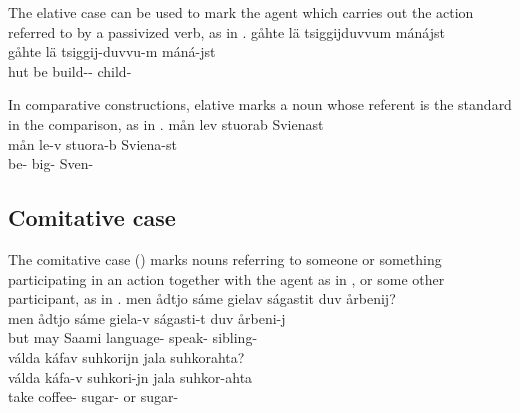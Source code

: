 The elative case can be used to mark the agent which carries out the action referred to by a passivized verb, as in .
\ea\label{elat5b}%
\glll	gåhte lä tsiggijduvvum {mánájst}\\
	gåhte lä tsiggij-duvvu-m máná-jst\\
	hut\BS{} be\BS{} build-- child-\\\nopagebreak
{}	
\z

In comparative constructions, elative marks a noun whose referent is the standard in the comparison, as in .
\ea\label{elat7}
\glll	mån lev stuorab {Svienast}\\
	mån le-v stuora-b Sviena-st\\
	 be- big- Sven-\\ %
 
\z


\subsection{Comitative case}\label{comitative}
The comitative case (\COMs) marks nouns referring to someone or something participating in an action together with the agent as in , or some other participant, as in .
\ea\label{com1}
\glll	men ådtjo sáme gielav ságastit duv {årbenij}?\\
	men ådtjo sáme giela-v ságasti-t duv årbeni-j\\
	but may\BS{} Saami\BS{} language- speak-  sibling-\\\nopagebreak
{} 
\z
\ea\label{com1b}
\glll	válda káfav {suhkorijn} jala suhkorahta?\\
	válda káfa-v suhkori-jn jala suhkor-ahta\\
	take\BS{} coffee- sugar- or sugar-\\\nopagebreak
{} 
\z

